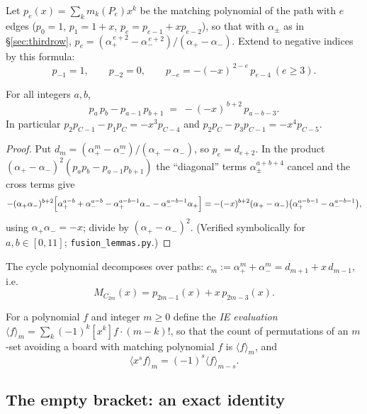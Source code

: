 Let $p_e(x)=\sum_k m_k(P_e)x^k$ be the matching polynomial of the path
with $e$ edges ($p_0=1$, $p_1=1+x$, $p_e=p_{e-1}+xp_{e-2}$), so that with
$\alpha_\pm$ as in \S\ref{sec:thirdrow},
$p_e=(\alpha_+^{\,e+2}-\alpha_-^{\,e+2})/(\alpha_+-\alpha_-)$.
Extend to negative indices by this formula:
\[
p_{-1}=1,\qquad p_{-2}=0,\qquad
p_{-e}=-(-x)^{\,2-e}\,p_{e-4}\ (e\ge3).
\]

\begin{lemma}\label{lem:wronskian}
For all integers $a,b$,
\begin{equation}\label{eq:wronskian}
p_a\,p_b-p_{a-1}\,p_{b+1}\;=\;-(-x)^{\,b+2}\,p_{a-b-3}.
\end{equation}
In particular $p_2p_{C-1}-p_1p_C=-x^3p_{C-4}$ and
$p_2p_C-p_3p_{C-1}=-x^4p_{C-5}$.
\end{lemma}

\begin{proof}
Put $d_m=(\alpha_+^m-\alpha_-^m)/(\alpha_+-\alpha_-)$, so $p_e=d_{e+2}$.
In the product $(\alpha_+-\alpha_-)^2(p_ap_b-p_{a-1}p_{b+1})$ the
``diagonal'' terms $\alpha_\pm^{a+b+4}$ cancel and the cross terms give
\[
-(\alpha_+\alpha_-)^{b+2}\Bigl[\alpha_+^{a-b}+\alpha_-^{a-b}
-\alpha_+^{a-b-1}\alpha_--\alpha_-^{a-b-1}\alpha_+\Bigr]
=-(-x)^{b+2}(\alpha_+-\alpha_-)\bigl(\alpha_+^{a-b-1}-\alpha_-^{a-b-1}\bigr),
\]
using $\alpha_+\alpha_-=-x$; divide by $(\alpha_+-\alpha_-)^2$.
(Verified symbolically for $a,b\in[0,11]$; \texttt{fusion\_lemmas.py}.)
\end{proof}

The cycle polynomial decomposes over paths:
$c_m:=\alpha_+^m+\alpha_-^m=d_{m+1}+x\,d_{m-1}$, i.e.
\begin{equation}\label{eq:cycletopath}
M_{C_{2m}}(x)=p_{2m-1}(x)+x\,p_{2m-3}(x).
\end{equation}

For a polynomial $f$ and integer $m\ge0$ define the \emph{IE evaluation}
$\langle f\rangle_m=\sum_k(-1)^k[x^k]f\cdot(m-k)!$, so that the count of
permutations of an $m$-set avoiding a board with matching polynomial $f$
is $\langle f\rangle_m$, and
\begin{equation}\label{eq:shift}
\langle x^s f\rangle_m=(-1)^s\langle f\rangle_{m-s}.
\end{equation}

\subsection{The empty bracket: an exact identity}

